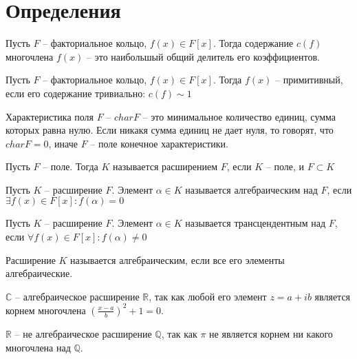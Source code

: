 \documentclass{article}
\begin{document}
\section{Определения}
\begin{definition}
    Пусть $F$ -- факториальное кольцо, $f(x) \in F[x]$. Тогда содержание $c(f)$ многочлена $f(x)$ -- это наибольшый
    общий делитель его коэффициентов.
\end{definition}

\begin{definition}
    Пусть $F$ -- факториальное кольцо, $f(x) \in F[x]$. Тогда $f(x)$ -- примитивный, если его содержание тривиально:
    $c(f) \sim 1$
\end{definition}

\begin{definition}
    Характеристика поля $F$ -- $char F$ -- это минимальное количество единиц, сумма которых равна нулю. Если никакя
    сумма единиц не дает нуля, то говорят, что $char F = 0$, иначе $F$ -- поле конечное характеристики.
\end{definition}

\begin{definition}
    Пусть $F$ -- поле. Тогда $K$ называется расширением $F$, если $K$ -- поле, и $F \subset K$
\end{definition}

\begin{definition}
    Пусть $K$ -- расширение $F$. Элемент $\alpha \in K$ называется алгебраическим над $F$, если $\exists f(x) \in F[x]:
    f(\alpha) = 0$
\end{definition}

\begin{definition}
    Пусть $K$ -- расширение $F$. Элемент $\alpha \in K$ называется трансцендентным над $F$, если $\forall f(x) \in F[x]:
    f(\alpha) \neq 0$
\end{definition}

\begin{definition}
    Расширение $K$ называется алгебраическим, если все его элементы алгебраические.
\end{definition}

\begin{example}
    $\mathbb{C}$ -- алгебраическое расширение $\mathbb{R}$, так как любой его элемент $z = a + ib$ является корнем
    многочлена $\left( \frac{x - a}{b} \right)^2 + 1 = 0$.
\end{example}

\begin{example}
    $\mathbb{R}$ -- не алгебраическое расширение $\mathbb{Q}$, так как $\pi$ не является корнем ни какого многочлена над
    $\mathbb{Q}$.
\end{example}
\end{document}
